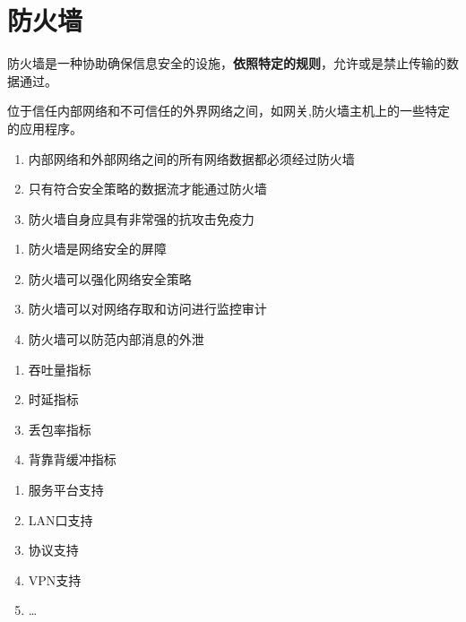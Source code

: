 \chapter{防火墙}
\clearquestion
{}
防火墙是一种协助确保信息安全的设施，\textbf{依照特定的规则}，允许或是禁止传输的数据通过。

位于信任内部网络和不可信任的外界网络之间，如网关,防火墙主机上的一些特定的应用程序。

\begin{enumerate}
	\item 内部网络和外部网络之间的所有网络数据都必须经过防火墙
	\item 只有符合安全策略的数据流才能通过防火墙
	\item 防火墙自身应具有非常强的抗攻击免疫力
\end{enumerate}

\begin{enumerate}
	\item 防火墙是网络安全的屏障
	\item 防火墙可以强化网络安全策略
	\item 防火墙可以对网络存取和访问进行监控审计
	\item 防火墙可以防范内部消息的外泄
\end{enumerate}

\begin{enumerate}
	\item 吞吐量指标
	\item 时延指标
	\item 丢包率指标
	\item 背靠背缓冲指标
\end{enumerate}

\begin{enumerate}
	\item 服务平台支持
	\item LAN口支持
	\item 协议支持
	\item VPN支持
	\item \dots
\end{enumerate}

